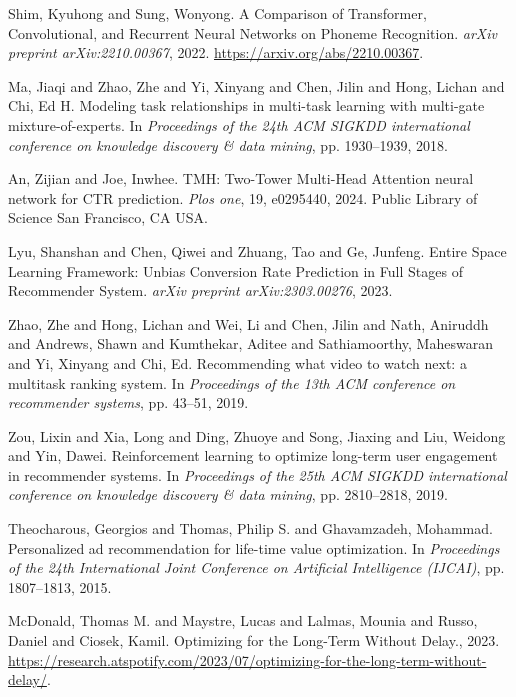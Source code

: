 \begin{thebibliography}{99}
 Shim, Kyuhong and Sung, Wonyong. {A} Comparison of {T}ransformer, {C}onvolutional, and {R}ecurrent {N}eural {N}etworks on {P}honeme {R}ecognition. \textit{arXiv preprint arXiv:2210.00367}, 2022. \url{https://arxiv.org/abs/2210.00367}.

 Ma, Jiaqi and Zhao, Zhe and Yi, Xinyang and Chen, Jilin and Hong, Lichan and Chi, Ed H. {M}odeling task relationships in multi-task learning with multi-gate mixture-of-experts. In \textit{Proceedings of the 24th ACM SIGKDD international conference on knowledge discovery \& data mining}, pp. 1930--1939, 2018.

 An, Zijian and Joe, Inwhee. T{M}H: {T}wo-{T}ower {M}ulti-{H}ead {A}ttention neural network for {C}TR prediction. \textit{Plos one}, 19, e0295440, 2024. Public Library of Science San Francisco, CA USA.

 Lyu, Shanshan and Chen, Qiwei and Zhuang, Tao and Ge, Junfeng. {E}ntire {S}pace {L}earning {F}ramework: {U}nbias {C}onversion {R}ate {P}rediction in {F}ull {S}tages of {R}ecommender {S}ystem. \textit{arXiv preprint arXiv:2303.00276}, 2023.

 Zhao, Zhe and Hong, Lichan and Wei, Li and Chen, Jilin and Nath, Aniruddh and Andrews, Shawn and Kumthekar, Aditee and Sathiamoorthy, Maheswaran and Yi, Xinyang and Chi, Ed. {R}ecommending what video to watch next: a multitask ranking system. In \textit{Proceedings of the 13th ACM conference on recommender systems}, pp. 43--51, 2019.

 Zou, Lixin and Xia, Long and Ding, Zhuoye and Song, Jiaxing and Liu, Weidong and Yin, Dawei. {R}einforcement learning to optimize long-term user engagement in recommender systems. In \textit{Proceedings of the 25th ACM SIGKDD international conference on knowledge discovery \& data mining}, pp. 2810--2818, 2019.

 Theocharous, Georgios and Thomas, Philip S. and Ghavamzadeh, Mohammad. {P}ersonalized ad recommendation for life-time value optimization. In \textit{Proceedings of the 24th International Joint Conference on Artificial Intelligence (IJCAI)}, pp. 1807--1813, 2015.

 McDonald, Thomas M. and Maystre, Lucas and Lalmas, Mounia and Russo, Daniel and Ciosek, Kamil. {O}ptimizing for the {L}ong-{T}erm {W}ithout {D}elay., 2023. \url{https://research.atspotify.com/2023/07/optimizing-for-the-long-term-without-delay/}.


\end{thebibliography}
